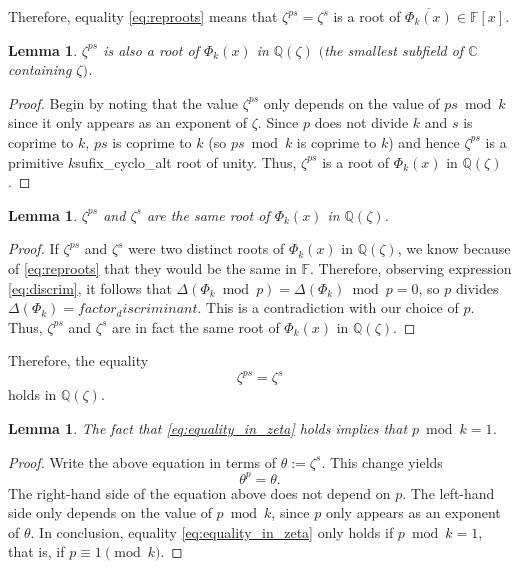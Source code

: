 \documentclass[a4paper, 12pt]{article}
\newtheorem{lemma}[theorem]{Lemma}
\theoremstyle{definition}
\newcommand{\Q}{\ensuremath{\mathbb{Q}}}
\newcommand{\C}{\ensuremath{\mathbb{C}}}
\newcommand{\F}{\ensuremath{\mathbb{F}}}
\begin{document}
Therefore, equality \eqref{eq:reproots} means that $\zeta^{ps}=\zeta^{s}$ is a root of $\overline{\Phi_{{k}}(x)}\in\F[x]$. 

\begin{lemma}
$\zeta^{ps}$ is also a root of $\Phi_{{k}}(x)$ in $\Q(\zeta)$ $($the smallest subfield of $\C$ containing $\zeta)$.
\end{lemma}
\begin{proof}
Begin by noting that the value $\zeta^{ps}$ only depends on the value of $ps \bmod{{k}}$ since it only appears as an exponent of $\zeta$. Since $p$ does not divide ${k}$ and $s$ is coprime to ${k}$, $ps$ is coprime to ${k}$ (so $ps \bmod{{k}}$ is coprime to ${k}$) and hence $\zeta^{ps}$ is a primitive ${k}${sufix_cyclo_alt} root of unity. Thus, $\zeta^{ps}$ is a root of $\Phi_{{k}}(x)$ in $\Q(\zeta)$.
\end{proof}

\begin{lemma}
$\zeta^{ps}$ and $\zeta^{s}$ are the same root of $\Phi_{{k}}(x)$ in $\Q(\zeta)$.
\end{lemma}
\begin{proof}
If $\zeta^{ps}$ and $\zeta^{s}$ were two distinct roots of $\Phi_{{k}}(x)$ in $\Q(\zeta)$, we know because of \eqref{eq:reproots} that they would be the same in $\F$. Therefore, observing expression \eqref{eq:discrim}, it follows that $\Delta(\Phi_{{k}} \bmod{p})=\Delta(\Phi_{{k}}) \bmod{p}=0$, so $p$ divides $\Delta(\Phi_{{k}})={factor_discriminant}$. This is a contradiction with our choice of $p$. Thus, $\zeta^{ps}$ and $\zeta^{s}$ are in fact the same root of $\Phi_{{k}}(x)$ in $\Q(\zeta)$.
\end{proof}

Therefore, the equality
\begin{equation}\label{eq:equality_in_zeta}
\zeta^{ps}=\zeta^{s}
\end{equation}
holds in $\Q(\zeta)$. 
\begin{lemma}
The fact that \eqref{eq:equality_in_zeta} holds implies that $p \bmod{{k}}=1$.
\end{lemma}
\begin{proof}
Write the above equation in terms of $\theta:=\zeta^{s}$. This change yields
\begin{equation*}
\theta^{p}=\theta.
\end{equation*}
The right-hand side of the equation above does not depend on $p$. The left-hand side only depends on the value of $p\bmod{{k}}$, since $p$ only appears as an exponent of $\theta$. In conclusion, equality \eqref{eq:equality_in_zeta} only holds if $p \bmod{{k}}=1$, that is, if $p\equiv 1\pmod{{k}}$.
\end{proof}
\end{document}
